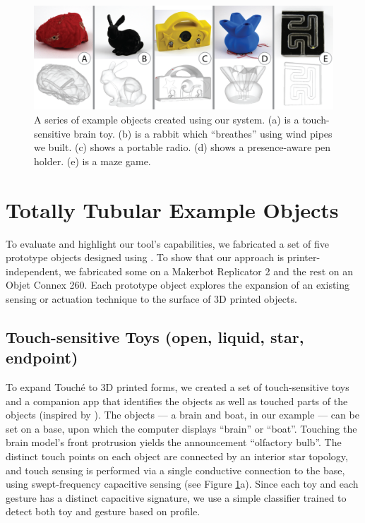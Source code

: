 \begin{figure}
\centering
    \includegraphics[width=7in]{figures/examples.png}
\caption{A series of example objects created using our system.  (a) is a touch-sensitive brain toy.  (b) is a rabbit which ``breathes'' using wind pipes we built.  (c) shows a portable radio.  (d) shows a presence-aware pen holder.  (e) is a maze game.}
\label{fig:examples}
\end{figure}

\section{Totally Tubular Example Objects}
To evaluate and highlight our tool's capabilities, we fabricated a set of five prototype objects designed using \systemnamenospace.  To show that our approach is printer-independent, we fabricated some on a Makerbot Replicator 2 and the rest on an Objet Connex 260.  Each prototype object explores the expansion of an existing sensing or actuation technique to the surface of 3D printed objects.

\subsection{Touch-sensitive Toys (open, liquid, star, endpoint)}

To expand Touch\'{e} \cite{Sato-touche} to 3D printed forms, we created a set of touch-sensitive toys and a companion app that identifies the objects as well as touched parts of the objects (inspired by \cite{Harrison-acoustic}). The objects --- a brain and boat, in our example --- can be set on a base, upon which the computer displays ``brain'' or ``boat''. Touching the brain model's front protrusion yields the announcement ``olfactory bulb''. The distinct touch points on each object are connected by an interior star topology, and touch sensing is performed via a single conductive connection to the base, using swept-frequency capacitive sensing (see Figure \ref{fig:examples}a). %
Since each toy and each gesture has a distinct capacitive signature, we use a simple classifier trained to detect both toy and gesture based on profile.


